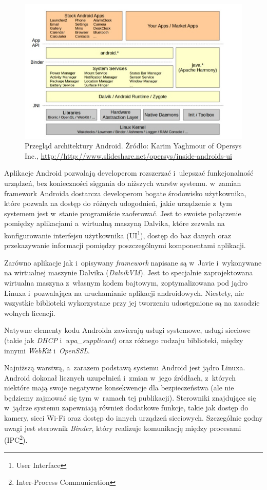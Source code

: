 \begin{figure}[!htb]
    \centering
    \includegraphics[width=17cm]{imgs/ch3_android_architecture_1.jpg}
    \caption
{Przegląd architektury Android. Źródło: Karim Yaghmour of Opersys Inc., \url{http://http://www.slideshare.net/opersys/inside-androids-ui}}
    \label{fig:ch3_android_architecture_1}
\end{figure} 

Aplikacje Android pozwalają developerom rozszerzać i~ulepszać funkcjonalność urządzeń, bez konieczności sięgania do niższych warstw systemu. w~zamian framework Androida dostarcza developerom bogate środowisko użytkownika, które pozwala na dostęp do różnych udogodnień, jakie urządzenie z~tym systemem jest w~stanie programiście zaoferować. Jest to swoiste połączenie pomiędzy aplikacjami a~wirtualną maszyną Dalvika, które zezwala na konfigurowanie interfejsu użytkownika (UI\footnote{User Interface}), dostęp do baz danych oraz przekazywanie informacji pomiędzy poszczególnymi komponentami aplikacji.

Zarówno aplikacje jak i~opisywany \textit{framework} napisane są w~Javie i~wykonywane na wirtualnej maszynie Dalvika (\textit{DalvikVM}). Jest to specjalnie zaprojektowana wirtualna maszyna z~własnym kodem bajtowym, zoptymalizowana pod jądro Linuxa i~pozwalająca na uruchamianie aplikacji androidowych. Niestety, nie wszystkie biblioteki wykorzystane przy jej tworzeniu udostępnione są na zasadzie wolnych licencji.

Natywne elementy kodu Androida zawierają usługi systemowe, usługi sieciowe (takie jak \textit{DHCP} i~\textit{wpa\_supplicant}) oraz różnego rodzaju biblioteki, między innymi \textit{WebKit} i~\textit{OpenSSL}. 

Najniższą warstwą, a~zarazem podstawą systemu Android jest jądro Linuxa. Android dokonał licznych uzupełnień i~zmian w~jego źródłach, z~których niektóre mają swoje negatywne konsekwencje dla bezpieczeństwa (ale nie będziemy zajmować się tym w~ramach tej publikacji). Sterowniki znajdujące się w~jądrze systemu zapewniają również dodatkowe funkcje, takie jak dostęp do kamery, sieci Wi-Fi oraz dostęp do innych urządzeń sieciowych. Szczególnie godny uwagi jest sterownik \textit{Binder}, który realizuje komunikację między procesami\cite{bib:hacker:handbook} (IPC\footnote{Inter-Process Communication}).

